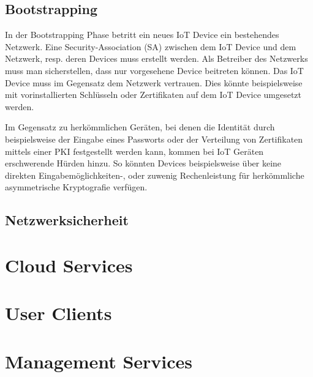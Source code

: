 \subsection{Bootstrapping}
In der Bootstrapping Phase betritt ein neues IoT Device ein bestehendes Netzwerk. Eine Security-Association (SA) zwischen dem IoT Device und dem Netzwerk, resp. deren Devices muss erstellt werden. Als Betreiber des Netzwerks muss man sicherstellen, dass nur vorgesehene Device beitreten können. Das IoT Device muss im Gegensatz dem Netzwerk vertrauen. Dies könnte beispielsweise mit vorinstallierten Schlüsseln oder Zertifikaten auf dem IoT Device umgesetzt werden.

Im Gegensatz zu herkömmlichen Geräten, bei denen die Identität durch beispielsweise der Eingabe eines Passworts oder der Verteilung von Zertifikaten mittels einer PKI festgestellt werden kann, kommen bei IoT Geräten erschwerende Hürden hinzu. So könnten Devices beispielsweise über keine direkten Eingabemöglichkeiten-, oder zuwenig Rechenleistung für herkömmliche asymmetrische Kryptografie verfügen.
\subsection{Netzwerksicherheit}

\section{Cloud Services}
\section{User Clients}
\section{Management Services}





